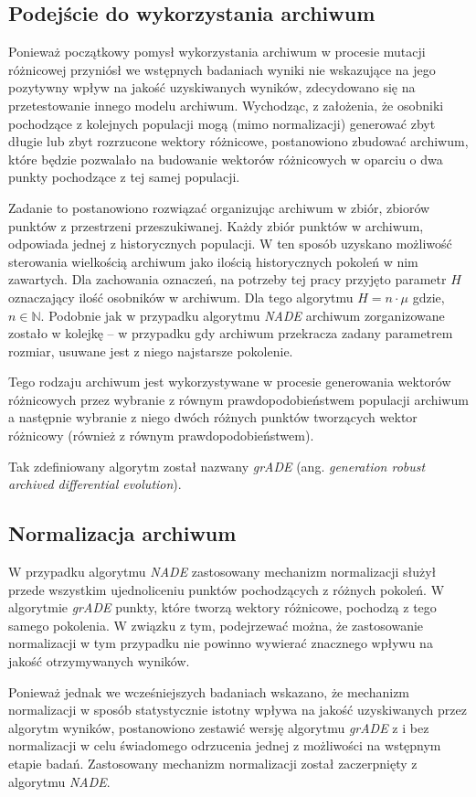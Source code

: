 \documentclass[12pt,a4paper]{report}
\begin{document}
{{{{{{\subsection{Podejście do wykorzystania archiwum}
\par{
Ponieważ początkowy pomysł wykorzystania archiwum w procesie mutacji różnicowej przyniósł we wstępnych badaniach wyniki nie wskazujące na jego pozytywny wpływ na jakość uzyskiwanych wyników, zdecydowano się na przetestowanie innego modelu archiwum. Wychodząc, z założenia, że osobniki pochodzące z kolejnych populacji mogą (mimo normalizacji) generować zbyt długie lub zbyt rozrzucone wektory różnicowe, postanowiono zbudować archiwum, które będzie pozwalało na budowanie wektorów różnicowych w oparciu o dwa punkty pochodzące z tej samej populacji.
}
\par{
Zadanie to postanowiono rozwiązać organizując archiwum w zbiór, zbiorów punktów z przestrzeni przeszukiwanej. Każdy zbiór punktów w archiwum, odpowiada jednej z historycznych populacji. W ten sposób uzyskano możliwość sterowania wielkością archiwum jako ilością historycznych pokoleń w nim zawartych. Dla zachowania oznaczeń, na potrzeby tej pracy przyjęto parametr $H$ oznaczający ilość osobników w archiwum. Dla tego algorytmu $H = n \cdot \mu$ gdzie, $n \in \mathbb{N}$. Podobnie jak w przypadku algorytmu \emph{NADE} archiwum zorganizowane zostało w kolejkę -- w przypadku gdy archiwum przekracza zadany parametrem rozmiar, usuwane jest z niego najstarsze pokolenie.
}
\par{
Tego rodzaju archiwum jest wykorzystywane w procesie generowania wektorów różnicowych przez wybranie z równym prawdopodobieństwem populacji archiwum a następnie wybranie z niego dwóch różnych punktów tworzących wektor różnicowy (również z równym prawdopodobieństwem).
}
\par{
Tak zdefiniowany algorytm został nazwany \emph{grADE} (ang. \emph{generation robust archived differential evolution}).
}
\subsection{Normalizacja archiwum}
\par{
W przypadku algorytmu \emph{NADE} zastosowany mechanizm normalizacji służył przede wszystkim ujednoliceniu punktów pochodzących z różnych pokoleń. W algorytmie \emph{grADE} punkty, które tworzą wektory różnicowe, pochodzą z tego samego pokolenia. W związku z tym, podejrzewać można, że zastosowanie normalizacji w tym przypadku nie powinno wywierać znacznego wpływu na jakość otrzymywanych wyników.
\par{
Ponieważ jednak we wcześniejszych badaniach wskazano, że mechanizm normalizacji w sposób statystycznie istotny wpływa na jakość uzyskiwanych przez algorytm wyników, postanowiono zestawić wersję algorytmu \emph{grADE} z i bez normalizacji w celu świadomego odrzucenia jednej z możliwości na wstępnym etapie badań. Zastosowany mechanizm normalizacji został zaczerpnięty z algorytmu \emph{NADE}.
}

}}}}}}}
\end{document}
